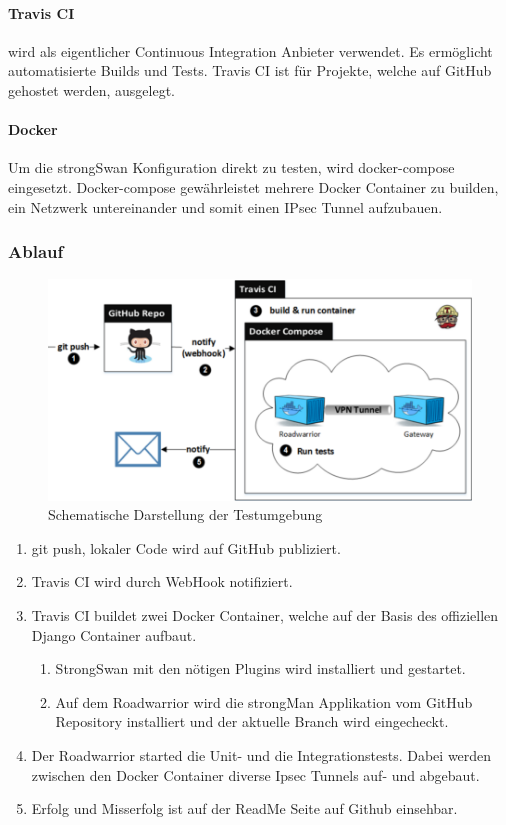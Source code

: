 \paragraph{Travis CI} wird als eigentlicher Continuous Integration Anbieter verwendet. Es ermöglicht automatisierte Builds und Tests. Travis CI ist für Projekte, welche auf GitHub gehostet werden, ausgelegt.

\paragraph{Docker} Um die strongSwan Konfiguration direkt zu testen, wird docker-compose eingesetzt. Docker-compose gewährleistet mehrere Docker Container zu builden, ein Netzwerk untereinander und somit einen IPsec Tunnel aufzubauen. \\

\subsubsection{Ablauf}
\begin{figure}[H]
\centering
\includegraphics[width=420pt]{images/testing.png}
\caption[Schematische Darstellung der Testumgebung]{Schematische Darstellung der Testumgebung}
\end{figure}\medskip
\begin{enumerate}
	\item git push, lokaler Code wird auf GitHub publiziert.
	\item Travis CI wird durch WebHook notifiziert.
	\item Travis CI buildet zwei Docker Container, welche auf der Basis des offiziellen Django Container aufbaut.
	\begin{enumerate}
         \item StrongSwan mit den nötigen Plugins wird installiert und gestartet.
         \item Auf dem Roadwarrior wird die strongMan Applikation vom GitHub Repository installiert und der aktuelle Branch wird eingecheckt.
      \end{enumerate}
      \item Der Roadwarrior started die Unit- und die Integrationstests. Dabei werden zwischen den Docker Container diverse Ipsec Tunnels auf- und abgebaut.
      \item Erfolg und Misserfolg ist auf der ReadMe Seite auf Github einsehbar.
\end{enumerate}

